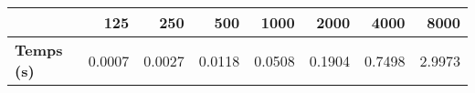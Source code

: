 \begin{tabular}{lrrrrrrr}
\toprule
{} &   125  &   250  &   500  &   1000 &   2000 &   4000 &   8000 \\
\midrule
\textbf{Temps (s)} & 0.0007 & 0.0027 & 0.0118 & 0.0508 & 0.1904 & 0.7498 & 2.9973 \\
\bottomrule
\end{tabular}
